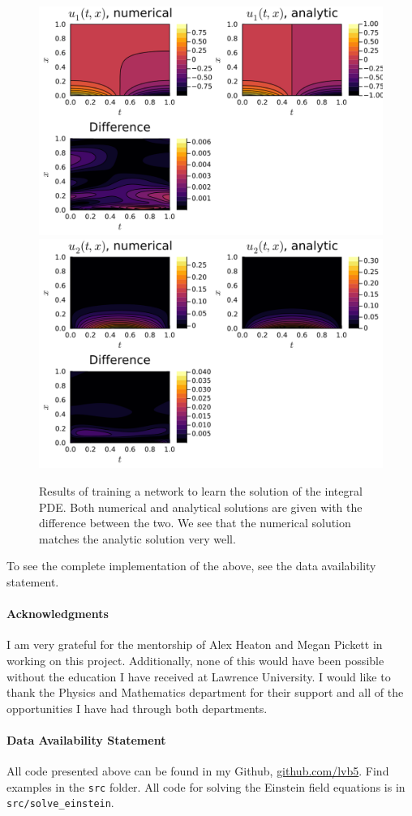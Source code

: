 \documentclass{CUP-JNL-DTM}%
\theoremstyle{definition}
\numberwithin{equation}{section}
\begin{document}
\begin{figure}
\centering
    \includegraphics[width=0.48\linewidth]{figures/integral_PDE_plots/plot_u1.png}
    \includegraphics[width=0.48\linewidth]{figures/integral_PDE_plots/plot_u2.png}
    \caption{Results of training a network to learn the solution of the integral PDE. Both numerical and analytical solutions are given with the difference between the two. We see that the numerical solution matches the analytic solution very well.}
    \label{fig:integro_results}
\end{figure}

To see the complete implementation of the above, see the data availability statement. 


\begin{Backmatter}

\paragraph{Acknowledgments}

I am very grateful for the mentorship of Alex Heaton and Megan Pickett in working on this project. Additionally, none of this would have been possible without the education I have received at Lawrence University. I would like to thank the Physics and Mathematics department for their support and all of the opportunities I have had through both departments. 

\paragraph{Data Availability Statement} All code presented above can be found in my Github, \href{https://github.com/lvb5/solve\_PDEs\_with\_PINN}{github.com/lvb5}. Find examples in the \texttt{src} folder. All code for solving the Einstein field equations is in \texttt{src/solve\_einstein}.  




\end{Backmatter}
\end{document}
